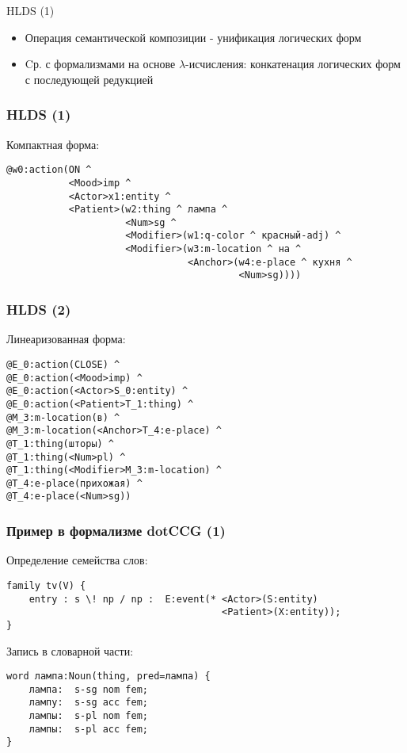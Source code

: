 \documentclass{beamer}
\begin{document}
\begin{frame}{HLDS (1)}
\begin{itemize}
	\item Операция семантической композиции - унификация логических форм
	\item Cр. с формализмами на основе $\lambda$-исчисления: конкатенация логических форм с последующей редукцией 
\end{itemize}
\end{frame}



\begin{frame}[fragile]
\frametitle{HLDS (1)}
Компактная форма:
{\footnotesize \begin{verbatim}
@w0:action(ON ^
           <Mood>imp ^
           <Actor>x1:entity ^
           <Patient>(w2:thing ^ лампа ^
                     <Num>sg ^
                     <Modifier>(w1:q-color ^ красный-adj) ^
                     <Modifier>(w3:m-location ^ на ^
                                <Anchor>(w4:e-place ^ кухня ^
                                         <Num>sg))))
\end{verbatim}}
\end{frame}

\begin{frame}[fragile]
\frametitle{HLDS (2)}
Линеаризованная форма:
{\footnotesize \begin{verbatim}
@E_0:action(CLOSE) ^ 
@E_0:action(<Mood>imp) ^
@E_0:action(<Actor>S_0:entity) ^ 
@E_0:action(<Patient>T_1:thing) ^ 
@M_3:m-location(в) ^ 
@M_3:m-location(<Anchor>T_4:e-place) ^ 
@T_1:thing(шторы) ^ 
@T_1:thing(<Num>pl) ^ 
@T_1:thing(<Modifier>M_3:m-location) ^ 
@T_4:e-place(прихожая) ^ 
@T_4:e-place(<Num>sg))
\end{verbatim}}
\end{frame}

\begin{frame}[fragile]
\frametitle{Пример в формализме dotCCG (1)}
Определение семейства слов:
{\footnotesize \begin{verbatim}
family tv(V) {
    entry : s \! np / np : 	E:event(* <Actor>(S:entity) 
                                      <Patient>(X:entity));
}
\end{verbatim}}
\bigskip
\bigskip
Запись в словарной части:
{\footnotesize \begin{verbatim}
word лампа:Noun(thing, pred=лампа) {
    лампа:  s-sg nom fem;
    лампу:  s-sg acc fem;
    лампы:  s-pl nom fem;
    лампы:  s-pl acc fem;
}
\end{verbatim}}
\end{frame}
\end{document}
